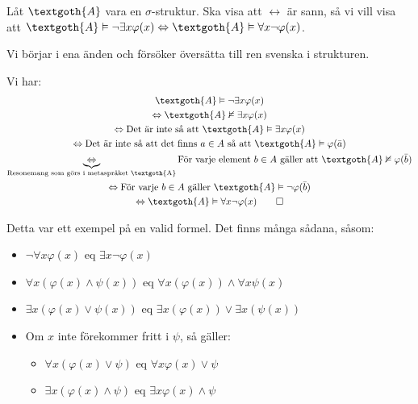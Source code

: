 \par\bigskip
\noindent Låt $\textgoth{A}$ vara en $\sigma$-struktur. Ska visa att $\leftrightarrow$ är sann, så vi vill visa att $\textgoth{A}\vDash\neg\exists x\varphi(x)\Lrarr\textgoth{A}\vDash\forall x\neg\varphi(x)$.
\par\bigskip
\noindent Vi börjar i ena änden och försöker översätta till ren svenska i strukturen.\par\noindent Vi har:
\begin{equation*}
  \begin{gathered}
    \textgoth{A}\vDash\neg\exists x\varphi(x)\\
    \Lrarr\textgoth{A}\nvDash\exists x\varphi(x)\\
    \Lrarr\text{Det är inte så att }\textgoth{A}\vDash\exists x\varphi(x)\\
    \Lrarr\text{Det är inte så att det finns }a\in A\text{ så att }\textgoth{A}\vDash\varphi(\bar{a})\\
    \underbrace{\Lrarr}_{\text{Resonemang som görs i metaspråket \textgoth{A}}}\text{För varje element } b\in A\text{ gäller att }\textgoth{A}\nvDash\varphi(\bar{b})\\
    \Lrarr\text{För varje }b\in A\text{ gäller }\textgoth{A}\vDash\neg\varphi(\bar{b})\\
    \Lrarr\textgoth{A}\vDash\forall x\neg\varphi(x)\qquad\Box
  \end{gathered}
\end{equation*}
\par\bigskip
\noindent Detta var ett exempel på en valid formel. Det finns många sådana, såsom:
\begin{itemize}
  \item $\neg\forall x\varphi(x)$ eq $\exists x\neg\varphi(x)$
  \item $\forall x(\varphi(x)\wedge\psi(x))$ eq $\forall x(\varphi(x))\wedge\forall x\psi(x)$
  \item $\exists x(\varphi(x)\vee\psi(x))$ eq $\exists x(\varphi(x))\vee\exists x(\psi(x))$
  \item Om $x$ inte förekommer fritt i $\psi$, så gäller:
    \begin{itemize}
      \item $\forall x(\varphi(x)\vee\psi)$ eq $\forall x\varphi(x)\vee\psi$
      \item $\exists x(\varphi(x)\wedge\psi)$ eq $\exists x\varphi(x)\wedge\psi$
    \end{itemize}
\end{itemize}
\par\bigskip

